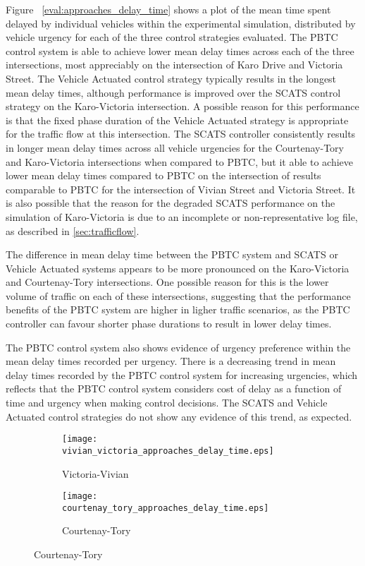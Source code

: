 {Figure ~\ref{eval:approaches_delay_time} shows a plot of the mean time spent delayed by individual vehicles within the experimental simulation, distributed by vehicle urgency for each of the three control strategies evaluated. The PBTC control system is able to achieve lower mean delay times across each of the three intersections, most appreciably on the intersection of Karo Drive and Victoria Street. The Vehicle Actuated control strategy typically results in the longest mean delay times, although performance is improved over the SCATS control strategy on the Karo-Victoria intersection. A possible reason for this performance is that the fixed phase duration of the Vehicle Actuated strategy is appropriate for the traffic flow at this intersection. The SCATS controller consistently results in longer mean delay times across all vehicle urgencies for the Courtenay-Tory and Karo-Victoria intersections when compared to PBTC, but it able to achieve lower mean delay times compared to PBTC on the intersection of results comparable to PBTC for the intersection of Vivian Street and Victoria Street. It is also possible that the reason for the degraded SCATS performance on the simulation of Karo-Victoria is due to an incomplete or non-representative log file, as described in \ref{sec:trafficflow}. 

The difference in mean delay time between the PBTC system and SCATS or Vehicle Actuated systems appears to be more pronounced on the Karo-Victoria and Courtenay-Tory intersections. One possible reason for this is the lower volume of traffic on each of these intersections, suggesting that the performance benefits of the PBTC system are higher in ligher traffic scenarios, as the PBTC controller can favour shorter phase durations to result in lower delay times. 

The PBTC control system also shows evidence of urgency preference within the mean delay times recorded per urgency. There is a decreasing trend in mean delay times recorded by the PBTC control system for increasing urgencies, which reflects that the PBTC control system considers cost of delay as a function of time and urgency when making control decisions. The SCATS and Vehicle Actuated control strategies do not show any evidence of this trend, as expected.

\begin{figure}
\centering
\begin{subfigure}{.5\textwidth}
  \centering
  \texttt{[image: vivian\_victoria\_approaches\_delay\_time.eps]}
  \caption{Victoria-Vivian}
  \label{approaches_delay_time:sub1}
\end{subfigure}%
\begin{subfigure}{.5\textwidth}
  \centering
  \texttt{[image: courtenay\_tory\_approaches\_delay\_time.eps]}
  \caption{Courtenay-Tory}
  \label{approaches_delay_time:sub2}
\end{subfigure}


\end{figure}}

